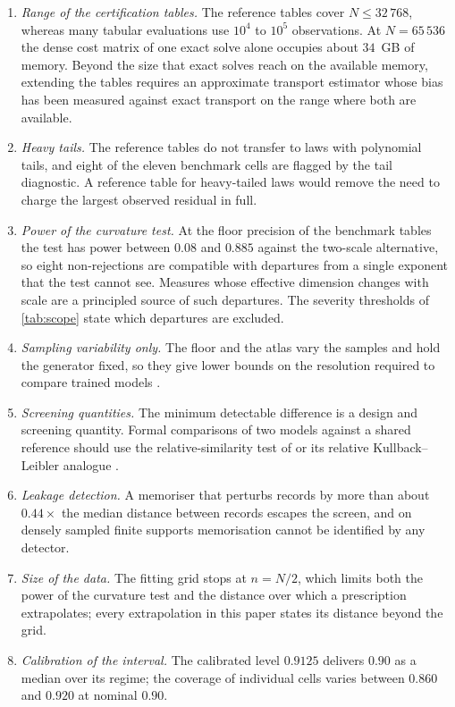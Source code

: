 \documentclass[twoside,11pt]{article}
\theoremstyle{plain}
\theoremstyle{definition}
\theoremstyle{remark}
\begin{document}
\begin{enumerate}[itemsep=4pt]
\item \emph{Range of the certification tables.} The reference tables cover
  $N \leq 32\,768$, whereas many tabular evaluations use $10^{4}$ to $10^{5}$
  observations. At $N = 65\,536$ the dense cost matrix of one exact solve
  alone occupies about $34$~GB of memory. Beyond the size that exact
  solves reach on the available memory, extending the tables requires an
  approximate transport estimator whose bias has been measured against
  exact transport on the range where both are available.
\item \emph{Heavy tails.} The reference tables do not transfer to laws
  with polynomial tails, and eight of the eleven benchmark cells are
  flagged by the tail diagnostic. A reference table for heavy-tailed laws
  would remove the need to charge the largest observed residual in full.
\item \emph{Power of the curvature test.} At the floor precision of the
  benchmark tables the test has power between $0.08$ and $0.885$ against
  the two-scale alternative, so eight non-rejections are compatible with
  departures from a single exponent that the test cannot see. Measures whose effective dimension changes with scale \citep{weedbach2019} are a
  principled source of such departures. The severity thresholds of
  \cref{tab:scope} state which departures are excluded.
\item \emph{Sampling variability only.} The floor and the atlas vary the
  samples and hold the generator fixed, so they give lower bounds on the
  resolution required to compare trained models \citep{bouthillier2021}.
\item \emph{Screening quantities.} The minimum detectable difference
  is a design and screening quantity. Formal comparisons of two models
  against a shared reference should use the relative-similarity test of
  \citet{bounliphone2016} or its relative Kullback--Leibler analogue
  \citep{gao2025}.
\item \emph{Leakage detection.} A memoriser that perturbs records by more
  than about $0.44\times$ the median distance between records escapes the
  screen, and on densely sampled finite supports memorisation cannot be
  identified by any detector.
\item \emph{Size of the data.} The fitting grid stops at $n = N/2$, which
  limits both the power of the curvature test and the distance over which a
  prescription extrapolates; every extrapolation in this paper states its
  distance beyond the grid.
\item \emph{Calibration of the interval.} The calibrated level
  $0.9125$ delivers $0.90$ as a median over its regime; the coverage of
  individual cells varies between $0.860$ and $0.920$ at nominal $0.90$.
\end{enumerate}
\end{document}
